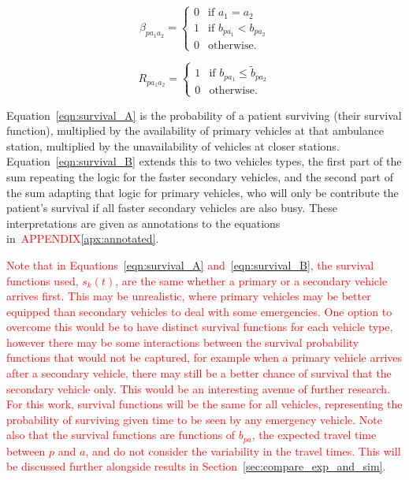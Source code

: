 \documentclass[numbers,webpdf,imaman]{ima-authoring-template}%
\begin{document}
\begin{equation}\label{eqn:beta}
\beta_{p a_1 a_2} = \begin{cases}
    0 & \text{if } a_1 = a_2\\
    1 & \text{if } b_{p a_1} < b_{p a_2}\\
    0 & \text{otherwise.}
\end{cases}
\end{equation}

\begin{equation}\label{eqn:R}
R_{p a_1 a_2} = \begin{cases}
    1 & \text{if } b_{p a_1} \leq \tilde{b}_{p a_2}\\
    0 & \text{otherwise.}
\end{cases}
\end{equation}

Equation~\ref{eqn:survival_A} is the probability of a patient surviving (their
survival function), multiplied by the availability of primary vehicles at that
ambulance station, multiplied by the unavailability of vehicles at closer
stations.
Equation~\ref{eqn:survival_B} extends this to two vehicles types, the first
part of the sum repeating the logic for the faster secondary vehicles, and the
second part of the sum adapting that logic for primary vehicles, who will only
be contribute the patient's survival if all faster secondary vehicles are also
busy. These interpretations are given as annotations to the equations
in~\textcolor{red}{APPENDIX}\ref{apx:annotated}.

\textcolor{red}{Note that in Equations~\ref{eqn:survival_A}
and~\ref{eqn:survival_B}, the survival functions used, $s_k(t)$, are the same
whether a primary or a secondary vehicle arrives first. This may be unrealistic,
where primary vehicles may be better equipped than secondary vehicles to deal
with some emergencies. One option to overcome this would be to have distinct
survival functions for each vehicle type, however there may be some interactions
between the survival probability functions that would not be captured, for
example when a primary vehicle arrives after a secondary vehicle, there may
still be a better chance of survival that the secondary vehicle only. This would
be an interesting avenue of further research. For this work, survival functions
will be the same for all vehicles, representing the probability of surviving
given time to be seen by any emergency vehicle.
Note also that the survival functions are functions of $b_{pa}$, the expected
travel time between $p$ and $a$, and do not consider the variability in the
travel times. This will be discussed further alongside results in
Section~\ref{sec:compare_exp_and_sim}.}
\end{document}
